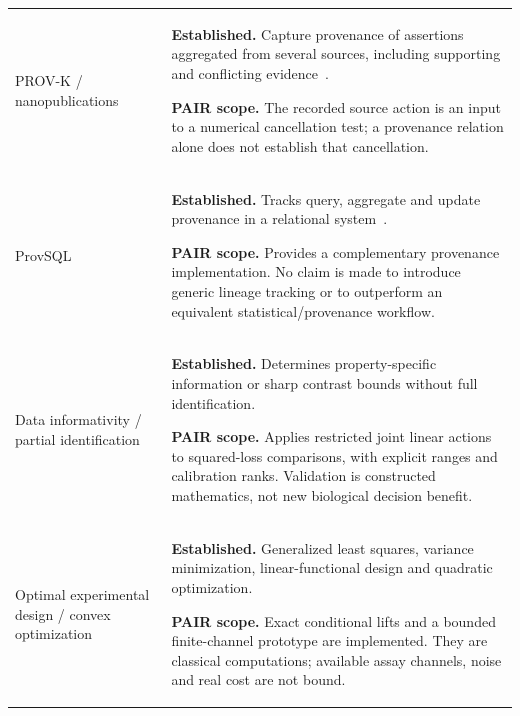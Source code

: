 \documentclass[11pt]{article}
\begin{document}
\begin{longtable}{@{}>{\raggedright\arraybackslash}p{}>{\raggedright\arraybackslash}p{}@{}}
PROV-K / nanopublications & \textbf{Established.} Capture provenance of assertions aggregated from several sources, including supporting and conflicting evidence~\cite{menotti2025provenance}. \par\smallskip\textbf{PAIR scope.} The recorded source action is an input to a numerical cancellation test; a provenance relation alone does not establish that cancellation.  \\
ProvSQL & \textbf{Established.} Tracks query, aggregate and update provenance in a relational system~\cite{sen2026provsql}. \par\smallskip\textbf{PAIR scope.} Provides a complementary provenance implementation. No claim is made to introduce generic lineage tracking or to outperform an equivalent statistical/provenance workflow.  \\
Data informativity / partial identification & \textbf{Established.} Determines property-specific information or sharp contrast bounds without full identification. \par\smallskip\textbf{PAIR scope.} Applies restricted joint linear actions to squared-loss comparisons, with explicit ranges and calibration ranks. Validation is constructed mathematics, not new biological decision benefit.  \\
Optimal experimental design / convex optimization & \textbf{Established.} Generalized least squares, variance minimization, linear-functional design and quadratic optimization. \par\smallskip\textbf{PAIR scope.} Exact conditional lifts and a bounded finite-channel prototype are implemented. They are classical computations; available assay channels, noise and real cost are not bound.  \\
\bottomrule
\end{longtable}
\endgroup
\end{document}
